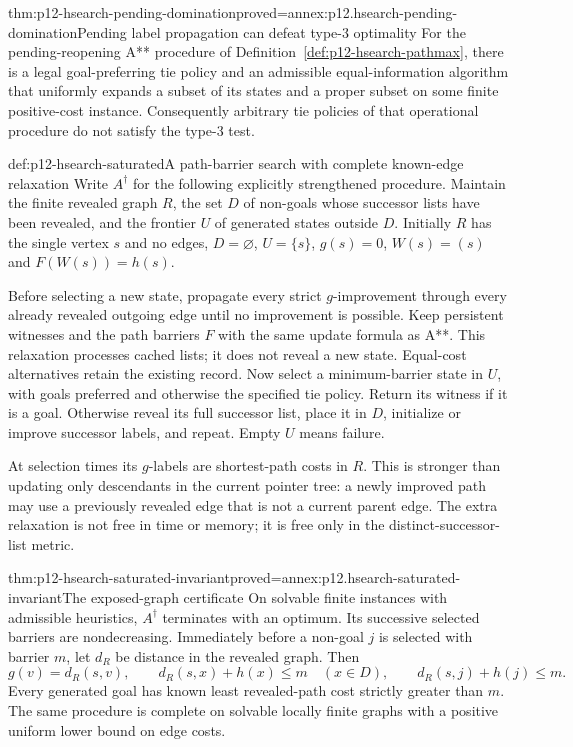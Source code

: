 \begin{hbtheorem}{thm:p12-hsearch-pending-domination}{proved=annex:p12.hsearch-pending-domination}{Pending label propagation can defeat type-3 optimality}
For the pending-reopening A** procedure of
Definition~\ref{def:p12-hsearch-pathmax}, there is a legal
goal-preferring tie policy and an admissible equal-information algorithm
that uniformly expands a subset of its states and a proper subset on
some finite positive-cost instance. Consequently arbitrary tie policies
of that operational procedure do not satisfy the type-3 test.
\end{hbtheorem}

\begin{hbmethod}{def:p12-hsearch-saturated}{A path-barrier search with complete known-edge relaxation}
Write \(A^\dagger\) for the following explicitly strengthened
procedure. Maintain the finite revealed graph \(R\), the set \(D\)
of non-goals whose successor lists have been revealed, and the frontier
\(U\) of generated states outside \(D\). Initially \(R\) has
the single vertex \(s\) and no edges, \(D=\varnothing\),
\(U=\{s\}\), \(g(s)=0\), \(W(s)=(s)\) and
\(F(W(s))=h(s)\).

Before selecting a new state, propagate every strict \(g\)-improvement
through every already revealed outgoing edge until no improvement is
possible. Keep persistent witnesses and the path barriers \(F\) with
the same update formula as A**. This relaxation processes cached lists;
it does not reveal a new state. Equal-cost alternatives retain the
existing record. Now select a minimum-barrier state in \(U\), with
goals preferred and otherwise the specified tie policy. Return its
witness if it is a goal. Otherwise reveal its full successor list,
place it in \(D\), initialize or improve successor labels, and repeat.
Empty \(U\) means failure.

At selection times its \(g\)-labels are shortest-path costs in
\(R\). This is stronger than updating only descendants in the current
pointer tree: a newly improved path may use a previously revealed edge
that is not a current parent edge. The extra relaxation is not free in
time or memory; it is free only in the distinct-successor-list metric.
\end{hbmethod}

\begin{hblemma}{thm:p12-hsearch-saturated-invariant}{proved=annex:p12.hsearch-saturated-invariant}{The exposed-graph certificate}
On solvable finite instances with admissible heuristics, \(A^\dagger\)
terminates with an optimum. Its successive selected barriers are
nondecreasing. Immediately
before a non-goal \(j\) is selected with barrier \(m\), let
\(d_R\) be distance in the revealed graph. Then
\[
 g(v)=d_R(s,v),\qquad
 d_R(s,x)+h(x)\le m\quad(x\in D),\qquad
 d_R(s,j)+h(j)\le m.
\]
Every generated goal has known least revealed-path cost strictly greater
than \(m\). The same procedure is complete on solvable locally finite
graphs with a positive uniform lower bound on edge costs.
\end{hblemma}

